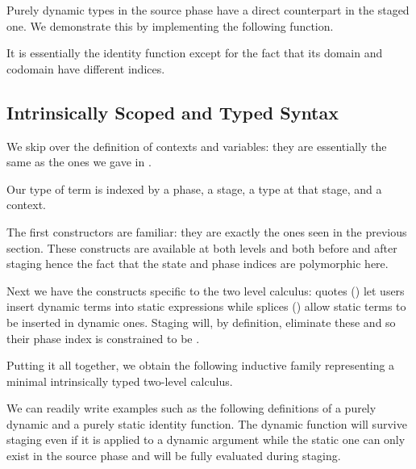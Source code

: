 \documentclass{article}
\begin{document}
Purely dynamic types in the source phase have a direct
counterpart in the staged one. We demonstrate this by
implementing the following  function.


It is essentially the identity function except for the
fact that its domain and codomain have different indices.

\subsection{Intrinsically Scoped and Typed Syntax}

We skip over the definition of contexts and variables: they
are essentially the same as the ones we gave in .

Our type of term is indexed by a phase, a stage, a type
at that stage, and a context.


The first constructors are familiar: they are exactly the ones
seen in the previous section. These constructs are available
at both levels and both before and after staging hence the fact
that the state and phase indices are polymorphic here.


Next we have the constructs specific to the two level calculus:
quotes () let users insert dynamic terms into static
expressions while splices () allow static terms to
be inserted in dynamic ones.
%
Staging will, by definition, eliminate these and so their phase
index is constrained to be .



Putting it all together, we obtain the following inductive
family representing a minimal intrinsically typed two-level
calculus.

\begin{AgdaAlign}
  \begin{AgdaSuppressSpace}
  \end{AgdaSuppressSpace}
\end{AgdaAlign}

We can readily write examples such as the following definitions
of a purely dynamic and a purely static identity function. The
dynamic function will survive staging even if it is applied to a
dynamic argument while the static one can only exist in the
source phase and will be fully evaluated during staging.
\end{document}
